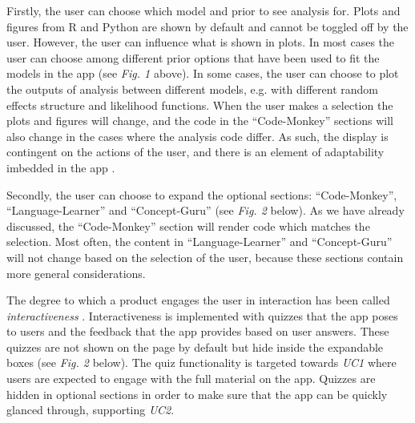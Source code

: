 \documentclass[12pt]{article}
\begin{document}
\vspace{5mm}

Firstly, the user can choose which model and prior to see analysis for.
Plots and figures from R and Python are shown by default and cannot be toggled off by the user.
However, the user can influence what is shown in plots. In most cases the user can choose
among different prior options that have been used to fit the models in the app
(see \emph{Fig. 1} above).
In some cases, the user can choose to plot the outputs of analysis between different models,
e.g. with different random effects structure and likelihood functions.
When the user makes a selection the plots and figures will change,
and the code in the “Code-Monkey” sections will also change in the cases where
the analysis code differ.
As such, the display is contingent on the actions of the user,
and there is an element of adaptability imbedded in the
app \autocite{janlert2017meaning}.


\vspace{5mm}

Secondly, the user can choose to expand the optional sections:
“Code-Monkey”, “Language-Learner” and “Concept-Guru” (see \emph{Fig. 2} below).
As we have already discussed, the “Code-Monkey” section will render code which matches the selection.
Most often, the content in “Language-Learner” and “Concept-Guru” will not
change
based on the selection of the user, because these sections contain more general considerations.

\vspace{5mm}

The degree to which a
product engages the user in interaction has been called \emph{interactiveness}
\autocite{janlert2017meaning}. Interactiveness is implemented with quizzes that the app
poses to users and the feedback that the app provides based on user answers.
These quizzes are not shown on the page by default but hide inside the
expandable boxes (see \emph{Fig. 2} below). The quiz functionality is targeted
towards \emph{UC1} where users are expected to engage with the full material on
the app. Quizzes are hidden in optional sections in order to make sure that the app can
be quickly glanced through, supporting \emph{UC2}.

\vspace{5mm}
\end{document}
